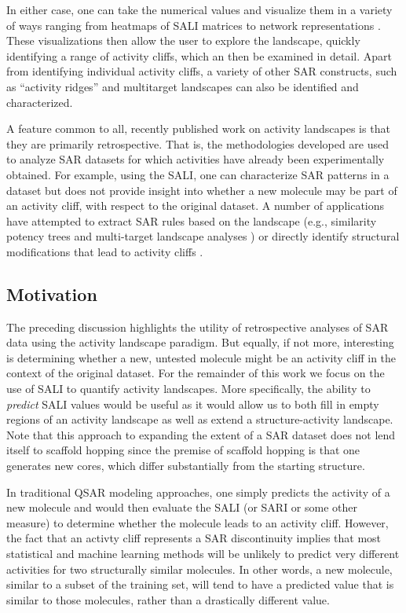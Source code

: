 \documentclass[letterpaper, 12pt]{article}
\begin{document}
In either case, one can take the numerical values and visualize them
in a variety of ways ranging from heatmaps of SALI matrices to network
representations \cite{Wawer:2008aa,Guha:2008aa}. These visualizations
then allow the user to explore the landscape, quickly identifying a
range of activity cliffs, which an then be examined in detail. Apart
from identifying individual activity cliffs, a variety of other SAR
constructs, such as ``activity ridges'' \cite{Vogt:2011bs} and
multitarget landscapes\cite{Dimova:2011fk} can also be identified and
characterized.

A feature common to all, recently published work on activity
landscapes is that they are primarily retrospective. That is, the
methodologies developed are used to analyze SAR datasets for which
activities have already been experimentally obtained. For example,
using the SALI, one can characterize SAR patterns in a dataset but
does not provide insight into whether a new molecule may be part of an
activity cliff, with respect to the original dataset. A number of
applications have attempted to extract SAR rules based on the
landscape (e.g., similarity potency trees \cite{Wawer:2010fv} and
multi-target landscape analyses \cite{Hu:2010kl}) or directly identify
structural modifications that lead to activity cliffs
\cite{Wassermann:2010oq, Peltason:2009vn}.

\subsection{Motivation}
\label{sec:motivation}
The preceding discussion highlights the utility of retrospective
analyses of SAR data using the activity landscape paradigm. But
equally, if not more, interesting is determining whether a new,
untested molecule might be an activity cliff in the context of the
original dataset. For the remainder of this work we focus on the use
of SALI to quantify activity landscapes. More specifically, the
ability to \emph{predict} SALI values would be useful as it would
allow us to both fill in empty regions of an activity landscape as
well as extend a structure-activity landscape. Note that this approach
to expanding the extent of a SAR dataset does not lend itself to
scaffold hopping since the premise of scaffold hopping is that one
generates new cores, which differ substantially from the starting
structure.

In traditional QSAR modeling approaches, one simply predicts the
activity of a new molecule and would then evaluate the SALI (or SARI
or some other measure) to determine whether the molecule leads to an
activity cliff. However, the fact that an activty cliff represents a
SAR discontinuity\cite{Maggiora:2006aa} implies that most statistical
and machine learning methods will be unlikely to predict very
different activities for two structurally similar molecules. In other
words, a new molecule, similar to a subset of the training set, will
tend to have a predicted value that is similar to those molecules,
rather than a drastically different value.
\end{document}
